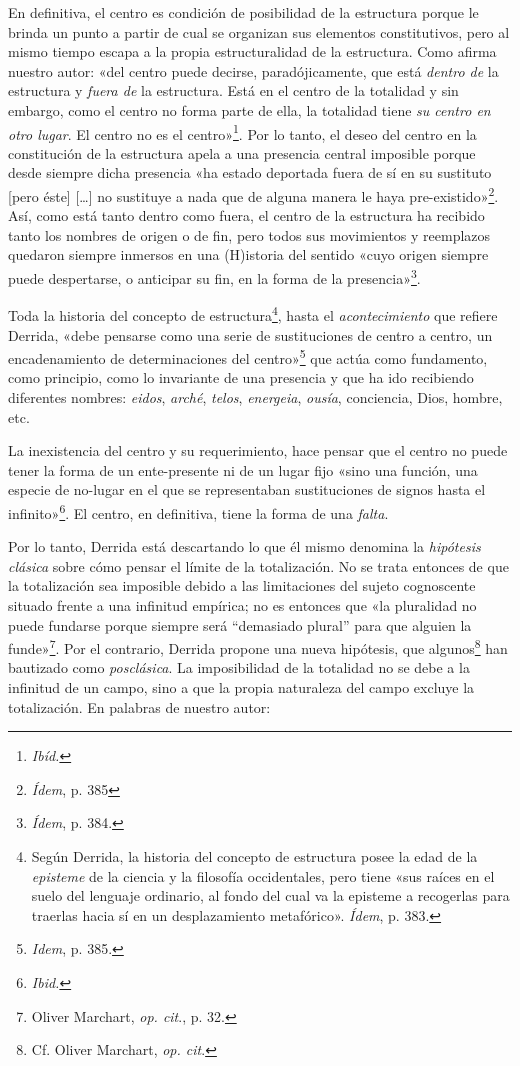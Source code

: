 En definitiva, el centro es condición de posibilidad de la estructura porque le brinda un punto a partir de cual se organizan sus elementos constitutivos, pero al mismo tiempo escapa a la propia estructuralidad de la estructura. Como afirma nuestro autor: «del centro puede decirse, paradójicamente, que está \emph{dentro de} la estructura y \emph{fuera de} la estructura. Está en el centro de la totalidad y sin embargo, como el centro no forma parte de ella, la totalidad tiene \emph{su centro en otro lugar}. El centro no es el centro»\footnote{\emph{Ibíd.}}. Por lo tanto, el deseo del centro en la constitución de la estructura apela a una presencia central imposible porque desde siempre dicha presencia «ha estado deportada fuera de sí en su sustituto {[}pero éste{]} {[}\ldots{]} no sustituye a nada que de alguna manera le haya pre-existido»\footnote{\emph{Ídem}, p. 385}. Así, como está tanto dentro como fuera, el centro de la estructura ha recibido tanto los nombres de origen o de fin, pero todos sus movimientos y reemplazos quedaron siempre inmersos en una (H)istoria del sentido «cuyo origen siempre puede despertarse, o anticipar su fin, en la forma de la presencia»\footnote{\emph{Ídem}, p. 384.}.

Toda la historia del concepto de estructura\footnote{Según Derrida, la historia del concepto de estructura posee la edad de la \emph{episteme} de la ciencia y la filosofía occidentales, pero tiene «sus raíces en el suelo del lenguaje ordinario, al fondo del cual va la episteme a recogerlas para traerlas hacia sí en un desplazamiento metafórico». \emph{Ídem}, p. 383.}, hasta el \emph{acontecimiento} que refiere Derrida, «debe pensarse como una serie de sustituciones de centro a centro, un encadenamiento de determinaciones del centro»\footnote{\emph{Idem}, p. 385.} que actúa como fundamento, como principio, como lo invariante de una presencia y que ha ido recibiendo diferentes nombres: \emph{eidos}, \emph{arché}, \emph{telos}, \emph{energeia}, \emph{ousía}, conciencia, Dios, hombre, etc.

La inexistencia del centro y su requerimiento, hace pensar que el centro no puede tener la forma de un ente-presente ni de un lugar fijo «sino una función, una especie de no-lugar en el que se representaban sustituciones de signos hasta el infinito»\footnote{\emph{Ibid.}}. El centro, en definitiva, tiene la forma de una \emph{falta}.

Por lo tanto, Derrida está descartando lo que él mismo denomina la \emph{hipótesis clásica} sobre cómo pensar el límite de la totalización. No se trata entonces de que la totalización sea imposible debido a las limitaciones del sujeto cognoscente situado frente a una infinitud empírica; no es entonces que «la pluralidad no puede fundarse porque siempre será ``demasiado plural'' para que alguien la funde»\footnote{Oliver Marchart, \emph{op. cit}., p. 32.}. Por el contrario, Derrida propone una nueva hipótesis, que algunos\footnote{Cf. Oliver Marchart, \emph{op. cit}.} han bautizado como \emph{posclásica}. La imposibilidad de la totalidad no se debe a la infinitud de un campo, sino a que la propia naturaleza del campo excluye la totalización. En palabras de nuestro autor:

